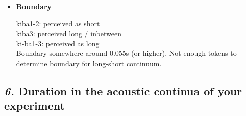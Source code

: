 \documentclass[12pt, english]{article}
\begin{document}
\begin{itemize}
    \item \textbf{Boundary} \par
    kiba1-2: perceived as short \\
    kiba3: perceived long / inbetween \\
    ki-ba1-3: perceived as long \\
    Boundary somewhere around 0.055s (or higher). Not enough tokens to determine boundary for long-short continuum.
\end{itemize}


\subsection*{\emph{6.} Duration in the acoustic continua of your experiment}
\vspace{10pt}
\end{document}
